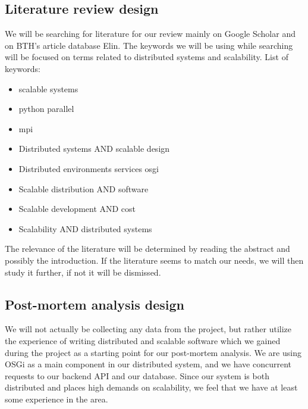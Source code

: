 \documentclass{article}
\begin{document}
\subsection{Literature review design}
We will be searching for literature for our review mainly on Google Scholar and
on BTH's article database Elin. The keywords we will be using while searching 
will be focused on terms related to distributed systems and scalability.
\newline
List of keywords:
\begin{itemize}
\item{scalable systems}
\item{python parallel}
\item{mpi}
\item{Distributed systems AND scalable design}
\item{Distributed environments services osgi}
\item{Scalable distribution AND software}
\item{Scalable development AND cost}
\item{Scalability AND distributed systems}
\end{itemize}

The relevance of the literature will be determined by reading the abstract and
possibly the introduction. If the literature seems to match our needs, we will
then study it further, if not it will be dismissed.

\subsection{Post-mortem analysis design}
 
We will not actually be collecting any data from the project, but rather
utilize the experience of writing distributed and scalable software which we
gained during the project as a starting point for our post-mortem analysis. We
are using OSGi \cite{marples2001open} as a main component in our distributed
system, and we have concurrent requests to our backend API and our database.
Since our system is both distributed and places high demands on scalability, we
feel that we have at least some experience in the area.



 
\end{document}

